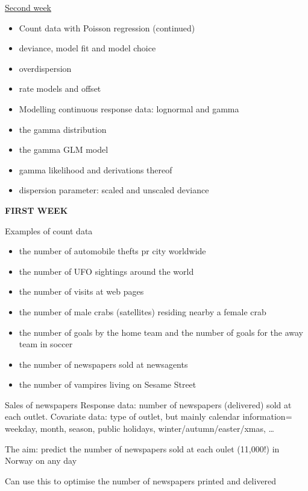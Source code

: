 \documentclass[
  ignorenonframetext,
]{beamer}
\providecommand{\tightlist}{%
  \setlength{\itemsep}{0pt}\setlength{\parskip}{0pt}}
\begin{document}
\begin{frame}
\begin{block}{\hyperlink{secondweek}{Second week}}
\label{second-week}
\begin{itemize}
\item
  Count data with Poisson regression (continued)
\item
  deviance, model fit and model choice
\item
  overdispersion
\item
  rate models and offset
\item
  Modelling continuous response data: lognormal and gamma
\item
  the gamma distribution
\item
  the gamma GLM model
\item
  gamma likelihood and derivations thereof
\item
  dispersion parameter: scaled and unscaled deviance
\end{itemize}
\end{block}
\end{frame}

\begin{frame}
\textbf{FIRST WEEK}
\end{frame}

\begin{frame}{Examples of count data}
\label{examples-of-count-data}
\begin{itemize}
\tightlist
\item
  the number of automobile thefts pr city worldwide
\item
  the number of UFO sightings around the world
\item
  the number of visits at web pages
\item
  the number of male crabs (satellites) residing nearby a female crab
\item
  the number of goals by the home team and the number of goals for the
  away team in soccer
\item
  the number of newspapers sold at newsagents
\item
  the number of vampires living on Sesame Street
\end{itemize}
\end{frame}

\begin{frame}
\begin{block}{Sales of newspapers}
\label{sales-of-newspapers}
Response data: number of newspapers (delivered) sold at each outlet.
Covariate data: type of outlet, but mainly calendar information=
weekday, month, season, public holidays, winter/autumn/easter/xmas,
\ldots{}

The aim: predict the number of newspapers sold at each oulet (11,000!)
in Norway on any day

Can use this to optimise the number of newspapers printed and delivered
\end{block}
\end{frame}
\end{document}

